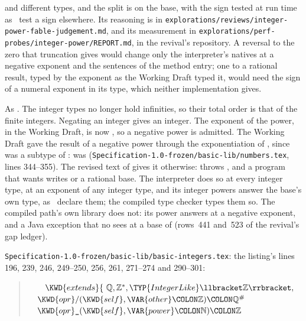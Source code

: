 \begin{description}
 and  different types, and the split is on the base,
with the sign tested at run time as \library\ test a sign elsewhere.
Its reasoning is in
\nolinkurl{explorations/reviews/integer-power-fable-judgement.md}, and its
measurement in \nolinkurl{explorations/perf-probes/integer-power/REPORT.md}, in
the revival's repository.
A reversal to the zero that truncation gives would change only the
interpreter's natives at a negative exponent and the sentences of the method
entry; one to a rational result, typed by the exponent as the Working Draft
typed it, would need the sign of a numeral exponent in its type, which neither
implementation gives.
\item[Effect] As .
The integer types no longer hold infinities, so their total order is that of the
finite integers. Negating an integer gives an integer.
The exponent of the power,  in the Working Draft, is now
, so a negative power is admitted.
The Working Draft gave the result of a negative power through the
exponentiation of , since  was a subtype of
:  was 
(\nolinkurl{Specification-1.0-frozen/basic-lib/numbers.tex}, lines 344--355).
The revised text of  gives it otherwise: 
throws , and a program that wants  writes
 or a rational base.
The interpreter does so at every integer type, at an exponent of any integer
type, and its integer powers answer the base's own type, as \library\ declare
them; the compiled type checker types them so.
The compiled path's own library does not: its  power answers
 at a negative exponent, and a Java exception that no  sees
at a base of  (rows~441 and~523 of the revival's gap ledger).
\item[Original text] \nolinkurl{Specification-1.0-frozen/basic-lib/basic-integers.tex}:
the listing's lines 196, 239, 246, 249--250, 256, 261, 271--274 and 290--301:
\begin{quote}
\begin{Fortress}
{\tt~~~~}\(    \KWD{extends} \{\, \null\)\(\mathbb{Q}, \mathbb{Z}^*, \TYP{IntegerLike}\llbracket\mathbb{Z}\rrbracket,\)\\
{\tt~~}\(  \KWD{opr} /(\KWD{self}, \VAR{other}\COLON \mathbb{Z})\COLON \mathbb{Q}^{\#}\)\\
{\tt~~}\(  \KWD{opr} \mathord{\hbox{\tt\char'137}}(\KWD{self}, \VAR{power}\COLON \mathbb{N})\COLON \mathbb{Z}\)\\

\end{Fortress}
\end{quote}
\end{description}
